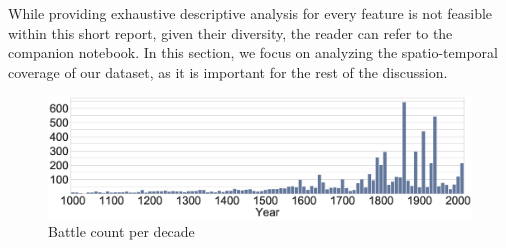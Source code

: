 While providing exhaustive descriptive analysis for every feature is not feasible within this short report, given their diversity, the reader can refer to the companion notebook. In this section, we focus on analyzing the spatio-temporal coverage of our dataset, as it is important for the rest of the discussion.

\begin{figure}[h]
	\centering
	\includegraphics[width=\linewidth]{figures/temporal_coverage.eps}
	\caption{Battle count per decade}
	\label{temporal_coverage}
\end{figure}